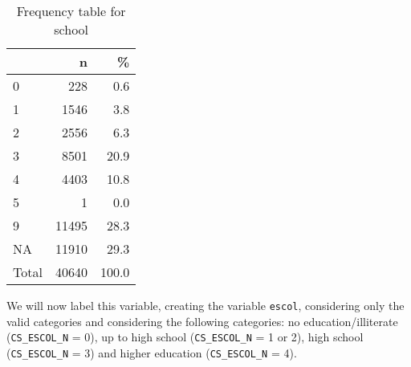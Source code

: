\documentclass[
]{article}
\newenvironment{Shaded}{\begin{snugshade}}{\end{snugshade}}
\newcommand{\CommentTok}[1]{\textcolor[rgb]{0.56,0.35,0.01}{\textit{#1}}}
\newcommand{\DataTypeTok}[1]{\textcolor[rgb]{0.13,0.29,0.53}{#1}}
\newcommand{\DecValTok}[1]{\textcolor[rgb]{0.00,0.00,0.81}{#1}}
\newcommand{\KeywordTok}[1]{\textcolor[rgb]{0.13,0.29,0.53}{\textbf{#1}}}
\newcommand{\NormalTok}[1]{#1}
\newcommand{\OperatorTok}[1]{\textcolor[rgb]{0.81,0.36,0.00}{\textbf{#1}}}
\newcommand{\OtherTok}[1]{\textcolor[rgb]{0.56,0.35,0.01}{#1}}
\newcommand{\StringTok}[1]{\textcolor[rgb]{0.31,0.60,0.02}{#1}}
\begin{document}
\begin{table}[!h]

\caption{\label{tab:unnamed-chunk-20}Frequency table for school}
\centering
\begin{tabular}[t]{l|r|r}
\hline
  & n & \%\\
\hline
0 & 228 & 0.6\\
\hline
1 & 1546 & 3.8\\
\hline
2 & 2556 & 6.3\\
\hline
3 & 8501 & 20.9\\
\hline
4 & 4403 & 10.8\\
\hline
5 & 1 & 0.0\\
\hline
9 & 11495 & 28.3\\
\hline
NA & 11910 & 29.3\\
\hline
Total & 40640 & 100.0\\
\hline
\end{tabular}
\end{table}

We will now label this variable, creating the variable \texttt{escol},
considering only the valid categories and considering the following
categories: no education/illiterate (\texttt{CS\_ESCOL\_N} = 0), up to
high school (\texttt{CS\_ESCOL\_N} = 1 or 2), high school
(\texttt{CS\_ESCOL\_N} = 3) and higher education (\texttt{CS\_ESCOL\_N}
= 4).

\begin{Shaded}
\end{Shaded}

\begin{Shaded}
\end{Shaded}
\end{document}

